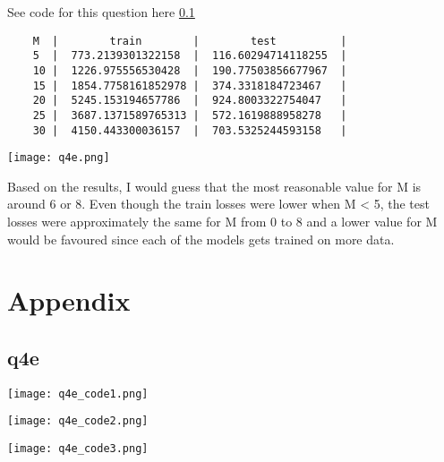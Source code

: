 \documentclass{article}
\begin{document}
See code for this question here \ref{code:q4e}

\begin{verbatim}
    M  |        train        |        test          |
    5  |  773.2139301322158  |  116.60294714118255  |
    10 |  1226.975556530428  |  190.77503856677967  |
    15 |  1854.7758161852978 |  374.3318184723467   |
    20 |  5245.153194657786  |  924.8003322754047   |
    25 |  3687.1371589765313 |  572.1619888958278   |
    30 |  4150.443300036157  |  703.5325244593158   |
\end{verbatim}

\texttt{[image: q4e.png]}

Based on the results, I would guess that the most reasonable 
value for M is around 6 or 8. Even though the train losses 
were lower when M < 5, the test losses were approximately 
the same for M from 0 to 8 and a lower value for M would be favoured
since each of the models gets trained on more data.

\newpage
\section*{Appendix}

\subsection{q4e}
\label{code:q4e}

\texttt{[image: q4e\_code1.png]}

\texttt{[image: q4e\_code2.png]}

\texttt{[image: q4e\_code3.png]}
\end{document}
